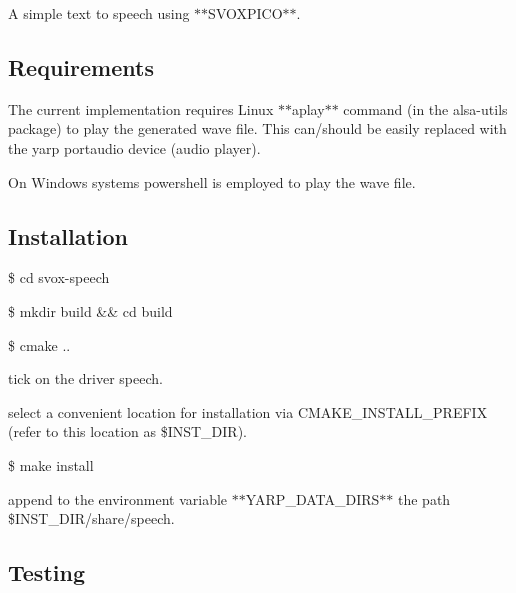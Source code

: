 A simple text to speech using $\ast$$\ast${\ttfamily S\+V\+O\+X\+P\+I\+CO}$\ast$$\ast$.

\subsection*{Requirements }

The current implementation requires Linux $\ast$$\ast${\ttfamily aplay}$\ast$$\ast$ command (in the {\ttfamily alsa-\/utils} package) to play the generated wave file. This can/should be easily replaced with the {\ttfamily yarp portaudio} device (audio player).

On Windows systems {\ttfamily powershell} is employed to play the wave file.

\subsection*{Installation }


\begin{DoxyItemize}
\item {\ttfamily \$ cd svox-\/speech}
\item {\ttfamily \$ mkdir build \&\& cd build}
\item {\ttfamily \$ cmake ..}
\item tick on the driver {\ttfamily speech}.
\item select a convenient location for installation via {\ttfamily C\+M\+A\+K\+E\+\_\+\+I\+N\+S\+T\+A\+L\+L\+\_\+\+P\+R\+E\+F\+IX} (refer to this location as {\ttfamily \$\+I\+N\+S\+T\+\_\+\+D\+IR}).
\item {\ttfamily \$ make install}
\item append to the environment variable $\ast$$\ast${\ttfamily Y\+A\+R\+P\+\_\+\+D\+A\+T\+A\+\_\+\+D\+I\+RS}$\ast$$\ast$ the path {\ttfamily \$\+I\+N\+S\+T\+\_\+\+D\+IR/share/speech}.
\end{DoxyItemize}

\subsection*{Testing }


\begin{DoxyCode}{0}
\end{DoxyCode}



\begin{DoxyCode}{0}
\end{DoxyCode}



\begin{DoxyCode}{0}
\end{DoxyCode}
 